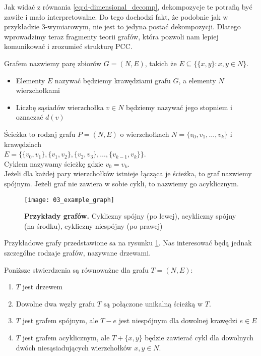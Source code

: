Jak widać z równania \ref{eq:d-dimensional_decomp}, dekompozycje te potrafią być zawiłe i mało interpretowalne. Do tego dochodzi fakt, że podobnie jak w przykładzie 3-wymiarowym, nie jest to jedyna postać dekompozycji. Dlatego wprowadzimy teraz fragmenty teorii grafów, która pozwoli nam lepiej komunikować i zrozumieć strukturę PCC.

\begin{df}
	Grafem nazwiemy parę zbiorów $G= (N, E)$, takich że $E \subseteq \{ \{x,y \}: x,y \in N \}$.
	\begin{itemize}
		\item Elementy $E$ nazywać będziemy krawędziami grafu $G$, a elementy $N$ wierzchołkami
		\item Liczbę sąsiadów wierzchołka $v\in N$ będziemy nazywać jego stopniem i oznaczać $d(v)$
	\end{itemize}
\end{df}

\begin{df}
	Ścieżka to rodzaj grafu $P = (N, E)$ o wierzchołkach $N = \{ v_0, v_1, \dots, v_k\}$ i krawędziach \\ $E = \{ \{v_0, v_1 \}, \{v_1, v_2 \}, \{v_2, v_3 \}, \dots, \{v_{k-1}, v_k \} \}$.\\
	Cyklem nazywamy ścieżkę gdzie $v_0=v_k$.\\
	Jeżeli dla każdej pary wierzchołków istnieje łącząca je ścieżka, to graf nazwiemy spójnym. Jeżeli graf nie zawiera w sobie cykli, to nazwiemy go acyklicznym. 
\end{df}

\begin{figure}[h]
	\centering
	\texttt{[image: 03\_example\_graph]}
	
	\caption{\textbf{Przykłady grafów.} Cykliczny spójny (po lewej), acykliczny spójny (na środku), cykliczny niespójny (po prawej)\label{fig:example_graph}}
\end{figure}

Przykładowe grafy przedstawione sa na rysunku \ref{fig:example_graph}. Nas interesować będą jednak szczególne rodzaje grafów, nazywane drzewami.
\begin{df}
	Poniższe stwierdzenia są równoważne dla grafu $T = (N, E)$:
	\begin{enumerate}
		\item $T$ jest drzewem
		\item Dowolne dwa węzły grafu $T$ są połączone unikalną ścieżką w $T$.
		\item $T$ jest grafem spójnym, ale $T-e$ jest niespójnym dla dowolnej krawędzi $e\in E$
		\item $T$ jest grafem acyklicznym, ale $T +\{x,y\}$ będzie zawierać cykl dla dowolnych dwóch niesąsiadujących wierzchołków $x, y \in N$.
	\end{enumerate}
\end{df}

